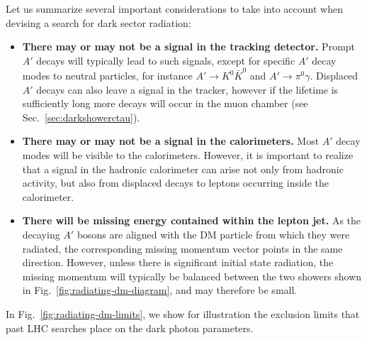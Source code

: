 Let us summarize several important considerations to take into account when devising a search for dark sector radiation:
\begin{itemize}
  \item {\bf There may or may not be a signal in the tracking detector.}
    Prompt $A'$ decays will typically lead to such signals, except for specific $A'$ decay modes to neutral particles, for instance $A' \to K^0 \bar{K}^0$ and $A' \to \pi^0 \gamma$. Displaced $A'$ decays can also leave a signal in the tracker, however if the lifetime is sufficiently long more decays will occur in the muon chamber (see Sec.~\ref{sec:darkshowerctau}).

  \item {\bf There may or may not be a signal in the calorimeters.}
    Most $A'$ decay modes will be visible to the calorimeters. However, it is important to realize that a signal in the hadronic calorimeter can arise not only from hadronic activity, but also from displaced decays to leptons occurring inside the calorimeter.

  \item {\bf There will be missing energy contained within the lepton jet.}
    As the decaying $A'$ bosons are aligned with the DM particle from which they were radiated, the corresponding missing momentum vector points in the same direction. However, unless there is significant initial state radiation, the missing momentum will typically be balanced between the two showers shown in Fig.~\ref{fig:radiating-dm-diagram}, and may therefore be small.
\end{itemize}

In Fig.~\ref{fig:radiating-dm-limits}, we show for illustration the exclusion limits that past LHC searches place on the dark photon parameters.

